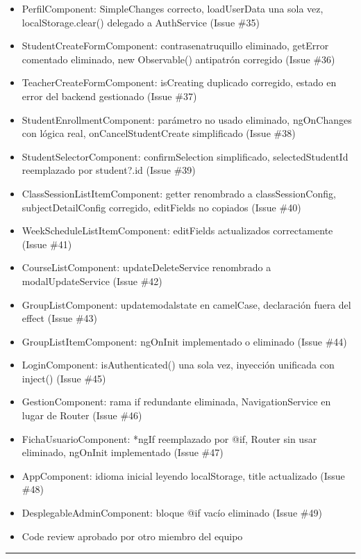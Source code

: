 \documentclass[
  spanish,
  11pt,
]{report}
\begin{document}
\begin{itemize}
  desuscrita (Issue \#34)
\item
  PerfilComponent: SimpleChanges correcto, loadUserData una sola vez,
  localStorage.clear() delegado a AuthService (Issue \#35)
\item
  StudentCreateFormComponent: contrasenatruquillo eliminado, getError
  comentado eliminado, new Observable() antipatrón corregido (Issue
  \#36)
\item
  TeacherCreateFormComponent: isCreating duplicado corregido, estado en
  error del backend gestionado (Issue \#37)
\item
  StudentEnrollmentComponent: parámetro no usado eliminado, ngOnChanges
  con lógica real, onCancelStudentCreate simplificado (Issue \#38)
\item
  StudentSelectorComponent: confirmSelection simplificado,
  selectedStudentId reemplazado por student?.id (Issue \#39)
\item
  ClassSessionListItemComponent: getter renombrado a classSessionConfig,
  subjectDetailConfig corregido, editFields no copiados (Issue \#40)
\item
  WeekScheduleListItemComponent: editFields actualizados correctamente
  (Issue \#41)
\item
  CourseListComponent: updateDeleteService renombrado a
  modalUpdateService (Issue \#42)
\item
  GroupListComponent: updatemodalstate en camelCase, declaración fuera
  del effect (Issue \#43)
\item
  GroupListItemComponent: ngOnInit implementado o eliminado (Issue \#44)
\item
  LoginComponent: isAuthenticated() una sola vez, inyección unificada
  con inject() (Issue \#45)
\item
  GestionComponent: rama if redundante eliminada, NavigationService en
  lugar de Router (Issue \#46)
\item
  FichaUsuarioComponent: *ngIf reemplazado por @if, Router sin usar
  eliminado, ngOnInit implementado (Issue \#47)
\item
  AppComponent: idioma inicial leyendo localStorage, title actualizado
  (Issue \#48)
\item
  DesplegableAdminComponent: bloque @if vacío eliminado (Issue \#49)
\item
  Code review aprobado por otro miembro del equipo
\end{itemize}

\begin{center}\rule{0.5\linewidth}{0.5pt}\end{center}
\end{document}
